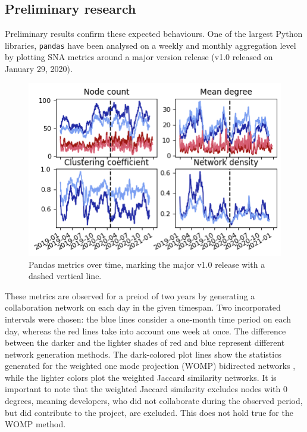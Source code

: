 \subsection{Preliminary research}
Preliminary results confirm these expected behaviours. One of the largest Python libraries, \texttt{pandas} have been analysed on a weekly and monthly aggregation level by plotting  SNA metrics around a major version release (v1.0 released on January 29, 2020). \\


\begin{figure}[h!]
    \centering
    \includegraphics{figures/pandas.png}
    \caption{Pandas metrics over time, marking the major v1.0 release with a dashed vertical line.}
    \label{fig:pandas}
\end{figure}

These metrics are observed for a preiod of two years by generating a collaboration network on each day in the given timespan. Two incorporated intervals were chosen: the blue lines consider a one-month time period on each day, whereas the red lines take into account one week at once. The difference between the darker and the lighter shades of red and blue represent different network generation methods. The dark-colored plot lines show the statistics generated for the weighted one mode projection (WOMP) bidirected networks \cite{stramWeightedOneMode2017}, while the lighter colors plot the weighted Jaccard similarity networks. It is important to note that the weighted Jaccard similarity excludes nodes with 0 degrees, meaning developers, who did not collaborate during the observed period, but did contribute to the project, are excluded. This does not hold true for the WOMP method. \\

